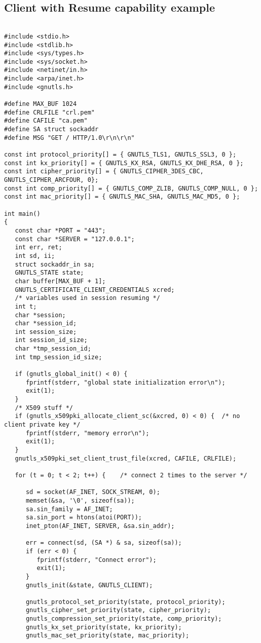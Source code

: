 \subsection{Client with Resume capability example}
\label{resume-example}
\begin{verbatim}

#include <stdio.h>
#include <stdlib.h>
#include <sys/types.h>
#include <sys/socket.h>
#include <netinet/in.h>
#include <arpa/inet.h>
#include <gnutls.h>

#define MAX_BUF 1024
#define CRLFILE "crl.pem"
#define CAFILE "ca.pem"
#define SA struct sockaddr
#define MSG "GET / HTTP/1.0\r\n\r\n"

const int protocol_priority[] = { GNUTLS_TLS1, GNUTLS_SSL3, 0 };
const int kx_priority[] = { GNUTLS_KX_RSA, GNUTLS_KX_DHE_RSA, 0 };
const int cipher_priority[] = { GNUTLS_CIPHER_3DES_CBC, GNUTLS_CIPHER_ARCFOUR, 0};
const int comp_priority[] = { GNUTLS_COMP_ZLIB, GNUTLS_COMP_NULL, 0 };
const int mac_priority[] = { GNUTLS_MAC_SHA, GNUTLS_MAC_MD5, 0 };

int main()
{
   const char *PORT = "443";
   const char *SERVER = "127.0.0.1";
   int err, ret;
   int sd, ii;
   struct sockaddr_in sa;
   GNUTLS_STATE state;
   char buffer[MAX_BUF + 1];
   GNUTLS_CERTIFICATE_CLIENT_CREDENTIALS xcred;
   /* variables used in session resuming */
   int t;
   char *session;
   char *session_id;
   int session_size;
   int session_id_size;
   char *tmp_session_id;
   int tmp_session_id_size;

   if (gnutls_global_init() < 0) {
      fprintf(stderr, "global state initialization error\n");
      exit(1);
   }
   /* X509 stuff */
   if (gnutls_x509pki_allocate_client_sc(&xcred, 0) < 0) {  /* no client private key */
      fprintf(stderr, "memory error\n");
      exit(1);
   }
   gnutls_x509pki_set_client_trust_file(xcred, CAFILE, CRLFILE);

   for (t = 0; t < 2; t++) {    /* connect 2 times to the server */

      sd = socket(AF_INET, SOCK_STREAM, 0);
      memset(&sa, '\0', sizeof(sa));
      sa.sin_family = AF_INET;
      sa.sin_port = htons(atoi(PORT));
      inet_pton(AF_INET, SERVER, &sa.sin_addr);

      err = connect(sd, (SA *) & sa, sizeof(sa));
      if (err < 0) {
         fprintf(stderr, "Connect error");
         exit(1);
      }
      gnutls_init(&state, GNUTLS_CLIENT);

      gnutls_protocol_set_priority(state, protocol_priority);
      gnutls_cipher_set_priority(state, cipher_priority);
      gnutls_compression_set_priority(state, comp_priority);
      gnutls_kx_set_priority(state, kx_priority);
      gnutls_mac_set_priority(state, mac_priority);


\end{verbatim}

